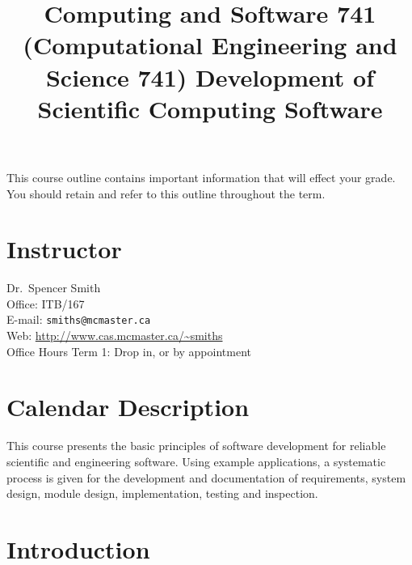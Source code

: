 \documentclass[12pt]{article}
\title{Computing and Software 741 (Computational Engineering and Science 741)
  Development of Scientific Computing Software}
\begin{document}
\maketitle

This course outline contains important information that will effect your
grade.  You should retain and refer to this outline throughout the term.

\section {Instructor}

Dr.~Spencer Smith\\
Office: ITB/167\\
E-mail: \texttt{smiths@mcmaster.ca}\\
Web: \url{http://www.cas.mcmaster.ca/~smiths}\\
Office Hours Term 1: Drop in, or by appointment\\

\section{Calendar Description} 

This course presents the basic principles of software development for reliable
scientific and engineering software.  Using example applications, a systematic
process is given for the development and documentation of requirements, system
design, module design, implementation, testing and inspection.

\section{Introduction}
\end{document}
